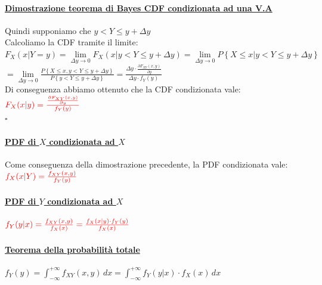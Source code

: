 \documentclass{article}
\begin{document}
\paragraph{\underline{Dimostrazione teorema di Bayes CDF condizionata ad una V.A}}
Quindi supponiamo che $y < Y \leq y + \Delta y$ \\
Calcoliamo la CDF tramite il limite: \\
$F_X(x|Y = y) = \underset{\Delta y \to 0 }{\lim} F_X(x | y < Y \leq y + \Delta y) = \underset{\Delta y \to 0 }{\lim} P \left\{X \leq x | y < Y \leq y + \Delta y\right\}$ \\
$= \underset{\Delta y \to 0 }{\lim} \frac{P\left\{X \leq x , y < Y \leq y + \Delta y \right\}}{P\left\{y < Y \leq y + \Delta y\right\}} = 
\frac{\Delta y \cdot \frac{\partial F_{XY}(x,y)}{\partial y}}{\Delta y \cdot f_Y(y)}$ \\
Di conseguenza abbiamo ottenuto che la CDF condizionata vale: 
$\color{red} F_X(x|y) = \frac{\frac{\partial F_{XY}(x,y)}{\partial y}}{f_Y(y)}$ \\
\hspace*{0pt}\hfill $\square$ \\
\paragraph{\underline{PDF di $X$ condizionata ad $X$}}
Come conseguenza della dimostrazione precedente, la PDF condizionata vale: 
$\color{red} f_X(x|Y) = \frac{f_{XY}(x,y)}{f_Y(y)}$ 
\paragraph{\underline{PDF di $Y$ condizionata ad $X$}}
$\color{red} f_Y(y|x) = \frac{f_{XY}(x,y)}{f_X(x)} = \frac{f_X(x|y) \cdot f_Y(y)}{f_X(x)}$
\paragraph{\underline{Teorema della probabilità totale}}
$f_Y(y) = \int_{-\infty}^{+\infty} f_{XY}(x,y) \,dx = \int_{-\infty}^{+\infty} f_Y(y|x) \cdot f_X(x) \,dx$
\end{document}

